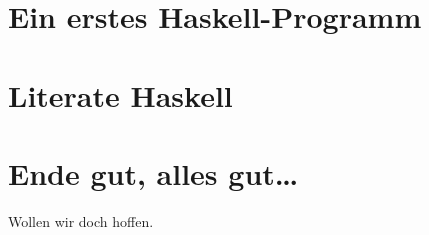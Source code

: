 \documentclass[utf]{uhb-inf}
\begin{document}
\section{Ein erstes Haskell-Programm}



\section{Literate Haskell}



\section{Ende gut, alles gut\ldots}

Wollen wir doch hoffen.
\end{document}
